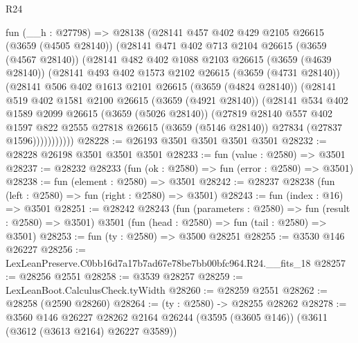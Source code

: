 \begin{lexlean}{R24}
\begin{coremodule}
      fun (__h : @27798) =>
      @28138
        (@28141
          @457
          @402
          @429
          @2105
          @26615
          (@3659 (@4505 @28140))
          (@28141
            @471
            @402
            @713
            @2104
            @26615
            (@3659 (@4567 @28140))
            (@28141
              @482
              @402
              @1088
              @2103
              @26615
              (@3659 (@4639 @28140))
              (@28141
                @493
                @402
                @1573
                @2102
                @26615
                (@3659 (@4731 @28140))
                (@28141
                  @506
                  @402
                  @1613
                  @2101
                  @26615
                  (@3659 (@4824 @28140))
                  (@28141
                    @519
                    @402
                    @1581
                    @2100
                    @26615
                    (@3659 (@4921 @28140))
                    (@28141
                      @534
                      @402
                      @1589
                      @2099
                      @26615
                      (@3659 (@5026 @28140))
                      (@27819
                        @28140
                        @557
                        @402
                        @1597
                        @822
                        @2555
                        @27818
                        @26615
                        (@3659 (@5146 @28140))
                        @27834
                        (@27837 @1596)))))))))))
@28228 := @26193 @3501 @3501 @3501 @3501
@28232 := @28228 @26198 @3501 @3501 @3501
@28233 := fun (value : @2580) => @3501
@28237 := @28232 @28233 (fun (ok : @2580) => fun (error : @2580) => @3501)
@28238 := fun (element : @2580) => @3501
@28242 := @28237 @28238 (fun (left : @2580) => fun (right : @2580) => @3501)
@28243 := fun (index : @16) => @3501
@28251 := @28242
    @28243
    (fun (parameters : @2580) => fun (result : @2580) => @3501)
    @3501
    (fun (head : @2580) => fun (tail : @2580) => @3501)
@28253 := fun (ty : @2580) => @3500 @28251
@28255 := @3530 @146 @26227
@28256 := LexLeanPreserve.C0bb16d7a17b7ad67e78be7bb00bfc964.R24.__fits_18
@28257 := @28256 @2551
@28258 := @3539 @28257
@28259 := LexLeanBoot.CalculusCheck.tyWidth
@28260 := @28259 @2551
@28262 := @28258 (@2590 @28260)
@28264 := (ty : @2580) -> @28255 @28262
@28278 := @3560
    @146
    @26227
    @28262
    @2164
    @26244
    (@3595 (@3605 @146))
    (@3611 (@3612 (@3613 @2164) @26227 @3589))

\end{coremodule}
\end{lexlean}
